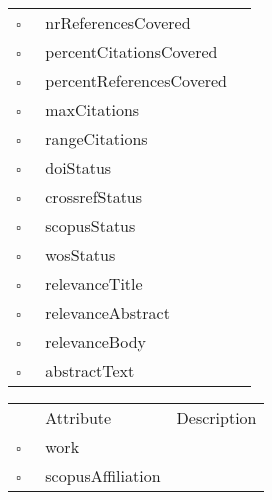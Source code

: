 \begin{table}
\begin{longtable}{llp{8cm}}
$\square$\ & nrReferencesCovered &  \\
$\square$\ & percentCitationsCovered &  \\
$\square$\ & percentReferencesCovered &  \\
$\square$\ & maxCitations &  \\
$\square$\ & rangeCitations &  \\
$\square$\ & doiStatus &  \\
$\square$\ & crossrefStatus &  \\
$\square$\ & scopusStatus &  \\
$\square$\ & wosStatus &  \\
$\square$\ & relevanceTitle &  \\
$\square$\ & relevanceAbstract &  \\
$\square$\ & relevanceBody &  \\
$\square$\ & abstractText &  \\
\end{longtable}
\label{attr:Work}
\end{table}

\clearpage
\begin{table}
\caption{WorkAffiliation  }

\begin{longtable}{llp{8cm}}
& Attribute & Description \\
$\square$\ & work &  \\
$\square$\ & scopusAffiliation &  \\
\end{longtable}
\label{attr:WorkAffiliation}
\end{table}
